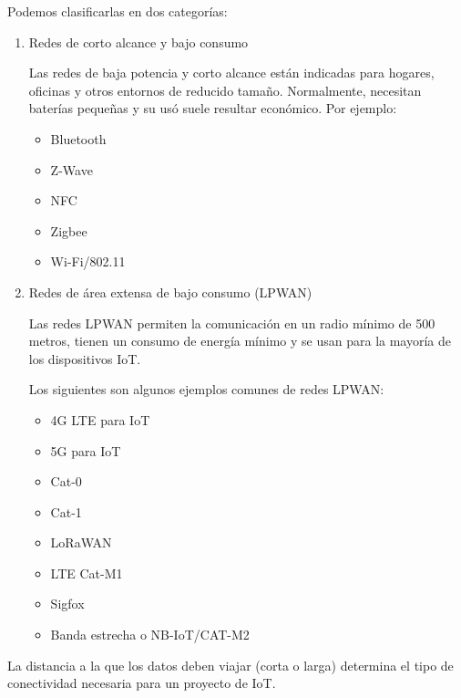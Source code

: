 Podemos clasificarlas en dos categorías:
\begin{enumerate}
\item Redes de corto alcance y bajo consumo 

Las redes de baja potencia y corto alcance están indicadas para hogares, oficinas y otros entornos de reducido tamaño. Normalmente, necesitan baterías pequeñas y su usó suele resultar económico. Por ejemplo:

\begin{itemize}
\item Bluetooth
\item Z-Wave
\item NFC
\item Zigbee
\item Wi-Fi/802.11
\end{itemize}

\vspace{1cm}

\item Redes de área extensa de bajo consumo (LPWAN)

Las redes LPWAN permiten la comunicación en un radio mínimo de 500 metros, tienen un consumo de energía mínimo y se usan para la mayoría de los dispositivos IoT. 

Los siguientes son algunos ejemplos comunes de redes LPWAN:

\begin{itemize}
\item 4G LTE para IoT
\item 5G para IoT
\item Cat-0
\item Cat-1
\item LoRaWAN
\item LTE Cat-M1
\item Sigfox
\item Banda estrecha o NB-IoT/CAT-M2
\end{itemize}

\end{enumerate}

\vspace{0.5cm}

La distancia a la que los datos deben viajar (corta o larga) determina el tipo de conectividad necesaria para un proyecto de IoT.

\let\cleardoublepage\clearpage %